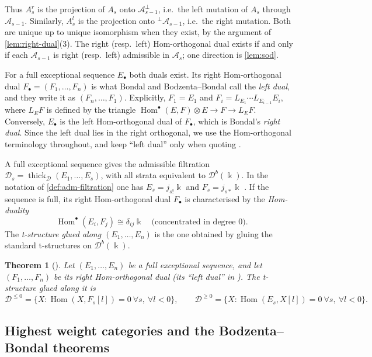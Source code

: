\documentclass[11pt,reqno]{amsart}
\theoremstyle{plain}
\newtheorem{theorem}{Theorem}[section]
\theoremstyle{definition}
\theoremstyle{remark}
\newcommand{\kk}{\Bbbk}
\DeclareMathOperator{\Hom}{Hom}
\newcommand{\Db}{\mathcal{D}^b}
\newcommand{\thick}[2][\cD]{\operatorname{thick}_{#1}(#2)}
\newcommand{\cD}{\mathcal{D}}
\newcommand{\cA}{\mathcal{A}}
\begin{document}
Thus $A^r_s$ is the projection of $A_s$ onto $\cA_{s-1}^\perp$, i.e.\ the left mutation of $A_s$ through $\cA_{s-1}$. Similarly, $A^l_s$ is the projection onto ${}^\perp\cA_{s-1}$, i.e.\ the right mutation. Both are unique up to unique isomorphism when they exist, by the argument of \cref{lem:right-dual}(3). The right (resp.\ left) Hom-orthogonal dual exists if and only if each $\cA_{s-1}$ is right (resp.\ left) admissible in $\cA_s$; one direction is \cref{lem:sod}.

For a full exceptional sequence $E_\bullet$ both duals exist. Its right Hom-orthogonal dual $F_\bullet=(F_1,\dots,F_n)$ is what Bondal and Bodzenta--Bondal call the \emph{left dual}, and they write it as $(F_n,\dots,F_1)$. Explicitly, $F_1=E_1$ and $F_i=L_{E_1}\cdots L_{E_{i-1}}E_i$, where $L_EF$ is defined by the triangle $\Hom^\bullet(E,F)\otimes E\to F\to L_EF$. Conversely, $E_\bullet$ is the left Hom-orthogonal dual of $F_\bullet$, which is Bondal's \emph{right dual}. Since the left dual lies in the right orthogonal, we use the Hom-orthogonal terminology throughout, and keep ``left dual'' only when quoting \cite{BB26}.

A full exceptional sequence gives the admissible filtration $\cD_s=\thick{E_1,\dots,E_s}$, with all strata equivalent to $\Db(\kk)$. In the notation of \cref{def:adm-filtration} one has $E_s=j_{s!}\kk$ and $F_s=j_{s*}\kk$ \cite[\S2.4]{BB26}. If the sequence is full, its right Hom-orthogonal dual $F_\bullet$ is characterised by the \emph{Hom-duality}
\begin{equation}\label{eq:hom-duality-exc}
\Hom^\bullet(E_i,F_j)\cong\delta_{ij}\kk\quad\text{(concentrated in degree $0$)}.
\end{equation}
The \emph{t-structure glued along $(E_1,\dots,E_n)$} is the one obtained by gluing the standard t-structures on $\Db(\kk)$.

\begin{theorem}[{\cite[Lemma~2.4]{BB26}}]\label{thm:BB-2.4}
Let $(E_1,\dots,E_n)$ be a full exceptional sequence, and let $(F_1,\dots,F_n)$ be its right Hom-orthogonal dual (its ``left dual'' in \cite{BB26}). The t-structure glued along it is
\[\cD^{\le0}=\{X:\Hom(X,F_s[l])=0\ \forall s,\ \forall l<0\},\qquad \cD^{\ge0}=\{X:\Hom(E_s,X[l])=0\ \forall s,\ \forall l<0\}.\]
\end{theorem}

\subsection{Highest weight categories and the Bodzenta--Bondal theorems}
\end{document}

